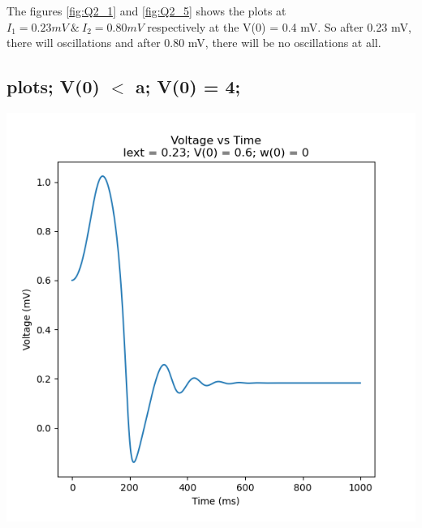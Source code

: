 \documentclass[a4paper, 12pt]{article}
\begin{document}
\vspace{2em}
\noindent
The figures \ref{fig:Q2_1} and \ref{fig:Q2_5} shows the plots at $ I_1 = 0.23 mV ~ \& ~ I_2 = 0.80 mV$ respectively at the V(0) = 0.4 mV. So after 0.23 mV, there will oscillations and after 0.80 mV, there will be no oscillations at all.

\subsection{ plots; V(0) $ < $ a; V(0) = 4;}

\begin{minipage}{0.45\linewidth}
    \includegraphics[width=\textwidth]{Q2_3}
    \label{fig:Q2_3}
\end{minipage}
\hfill
\end{document}
